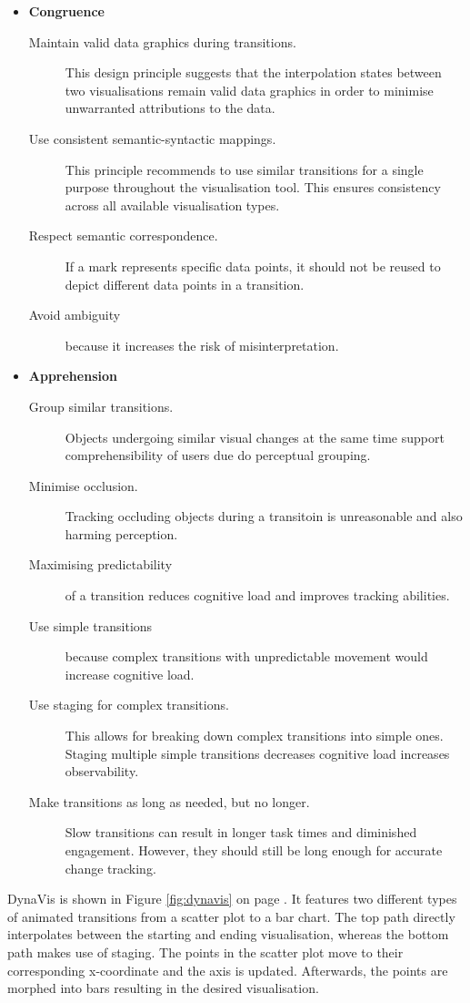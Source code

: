 \begin{itemize}
\item \textbf{Congruence}
\begin{description}
\item[Maintain valid data graphics during transitions.] This design principle suggests that the interpolation states between two visualisations remain valid data graphics in order to minimise unwarranted attributions to the data.
\item[Use consistent semantic-syntactic mappings.] This principle recommends to use similar transitions for a single purpose throughout the visualisation tool. This ensures consistency across all available visualisation types.
\item[Respect semantic correspondence.] If a mark represents specific data points, it should not be reused to depict different data points in a transition.
\item[Avoid ambiguity] because it increases the risk of misinterpretation.
\end{description}

\item \textbf{Apprehension}
\begin{description}
\item[Group similar transitions.] Objects undergoing similar visual changes at the same time support comprehensibility of users due do perceptual grouping.
\item[Minimise occlusion.] Tracking occluding objects during a transitoin is unreasonable and also harming perception.
\item[Maximising predictability] of a transition reduces cognitive load and improves tracking abilities.
\item[Use simple transitions] because complex transitions with unpredictable movement would increase cognitive load.
\item[Use staging for complex transitions.] This allows for breaking down complex transitions into simple ones. Staging multiple simple transitions decreases cognitive load increases observability.
\item[Make transitions as long as needed, but no longer.] Slow transitions can result in longer task times and diminished engagement. However, they should still be long enough for accurate change tracking.
\end{description}

\end{itemize}

DynaVis is shown in Figure \ref{fig:dynavis} on page \pageref{fig:dynavis}. It features two different types of animated transitions from a scatter plot to a bar chart. The top path directly interpolates between the starting and ending visualisation, whereas the bottom path makes use of staging. The points in the scatter plot move to their corresponding x-coordinate and the axis is updated. Afterwards, the points are morphed into bars resulting in the desired visualisation.

